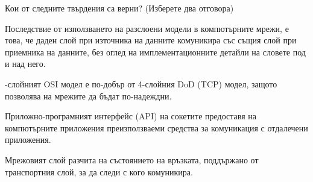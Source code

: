 \question[6] Кои от следните твърдения са верни? (Изберете два отговора)

\begin{choices}
  \CorrectChoice Последствие от използването на разслоени модели в компютърните
  мрежи, е това, че даден слой при източника на данните комуникира със същия
  слой при приемника на данните, без оглед на имплементационните детайли на
  словете под и над него.

  -слойният OSI модел е по-добър от 4-слойния
  \foreignlanguage{english}{DoD} (TCP) модел, защото позволява на мрежите да
  бъдат по-надеждни.

  \CorrectChoice Приложно-програмният интерфейс (API) на сокетите предоставя на
  компютърните приложения преизползваеми средства за комуникация с отдалечени
  приложения.

  \choice Мрежовият слой разчита на състоянието на връзката, поддържано от
  транспортния слой, за да следи с кого комуникира.
\end{choices}